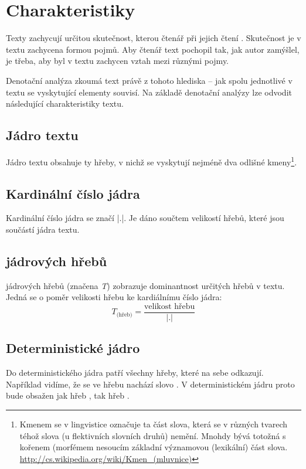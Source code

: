 \section{Charakteristiky}

Texty zachycují určitou skutečnost, kterou čtenář při jejich čtení . Skutečnost je v textu zachycena formou pojmů. Aby čtenář text pochopil tak, jak autor zamýšlel, je třeba, aby byl v textu zachycen vztah mezi různými pojmy.

Denotační analýza zkoumá text právě z tohoto hlediska -- jak spolu jednotlivé v textu se vyskytující elementy souvisí. Na základě denotační analýzy lze odvodit následující charakteristiky textu.

\subsection{Jádro textu}
Jádro textu obsahuje ty hřeby, v nichž se vyskytují nejméně dva odlišné kmeny\footnote{Kmenem se v lingvistice označuje ta část slova, která se v různých tvarech téhož slova (u flektivních slovních druhů) nemění. Mnohdy bývá totožná s kořenem (morfémem nesoucím základní významovou (lexikální) část slova. \url{http://cs.wikipedia.org/wiki/Kmen_(mluvnice)} }.

\subsection{Kardinální číslo jádra}
Kardinální číslo jádra se značí |.|. Je dáno součtem velikostí hřebů, které jsou součástí jádra textu.

\subsection{ jádrových hřebů}
 jádrových hřebů (značena \textit{T}) zobrazuje dominantnost určitých hřebů v textu.  Jedná se o poměr velikosti hřebu ke kardiálnímu číslo jádra:
\begin{equation}
T_\text{(hřeb)}=\frac{\text{velikost hřebu}}{|.|}
\end{equation}

\subsection{Deterministické jádro}
Do deterministického jádra patří všechny hřeby, které na sebe odkazují. Například vidíme, že se ve hřebu  nachází slovo . V deterministickém jádru proto bude obsažen jak hřeb , tak hřeb .

